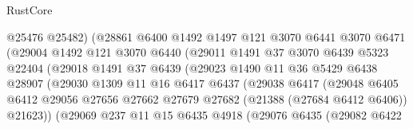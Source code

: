 \begin{lexlean}{RustCore}
\begin{coremodule}
                            @25476
                            @25482)
                          (@28861
                            @6400
                            @1492
                            @1497
                            @121
                            @3070
                            @6441
                            @3070
                            @6471
                            (@29004
                              @1492
                              @121
                              @3070
                              @6440
                              (@29011
                                @1491
                                @37
                                @3070
                                @6439
                                @5323
                                @22404
                                (@29018
                                  @1491
                                  @37
                                  @6439
                                  (@29023
                                    @1490
                                    @11
                                    @36
                                    @5429
                                    @6438
                                    @28907
                                    (@29030
                                      @1309
                                      @11
                                      @16
                                      @6417
                                      @6437
                                      (@29038
                                        @6417
                                        (@29048
                                          @6405
                                          @6412
                                          @29056
                                          @27656
                                          @27662
                                          @27679
                                          @27682
                                          (@21388 (@27684 @6412 @6406))
                                          @21623))
                                      (@29069
                                        @237
                                        @11
                                        @15
                                        @6435
                                        @4918
                                        (@29076
                                          @6435
                                          (@29082
                                            @6422

\end{coremodule}
\end{lexlean}
